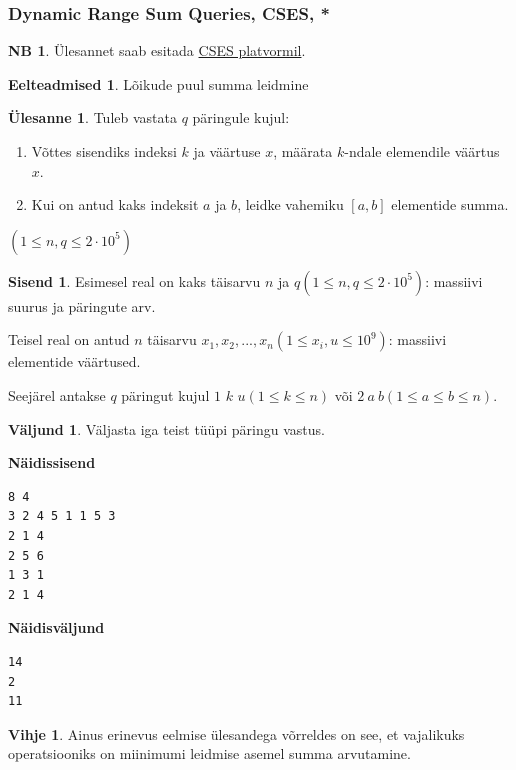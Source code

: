 \documentclass{trkut}
\theoremstyle{definition}
\newtheorem*{prereq}{Eelteadmised}
\newtheorem*{extra}{NB}
\newtheorem*{vihje}{Vihje}
\newtheorem*{Input}{Sisend}
\newtheorem*{Output}{Väljund}
\newtheorem*{Text}{Ülesanne}
\begin{document}
\subsubsection{Dynamic Range Sum Queries, CSES, *}
\begin{extra}
Ülesannet saab esitada \href{https://cses.fi/problemset/task/1648}{CSES platvormil}.
\end{extra}
\begin{prereq}
Lõikude puul summa leidmine
\end{prereq}
\begin{Text}
Tuleb vastata $q$ päringule kujul:
\begin{enumerate}
\item Võttes sisendiks indeksi $k$ ja väärtuse $x$, määrata $k$-ndale elemendile väärtus $x$.
\item Kui on antud kaks indeksit $a$ ja $b$, leidke vahemiku $[a,b]$ elementide summa.
\end{enumerate}

$(1\le n,q\le 2\cdot 10^5)$

\parencite{sum}
\end{Text}

\begin{Input}
Esimesel real on kaks täisarvu $n$ ja $q$$(1\le n,q\le 2\cdot 10^5)$: massiivi suurus ja päringute arv.

Teisel real on antud $n$ täisarvu $x_1,x_2,...,x_n$$(1\le x_i,u\le 10^9)$: massiivi elementide väärtused.

Seejärel antakse $q$ päringut kujul $1$ $k$ $u$$(1\le k\le n)$ või $2\ a\ b$$(1\le a\le b\le n)$.
\end{Input}
\begin{Output}
Väljasta iga teist tüüpi päringu vastus.
\end{Output}

\textbf{Näidissisend}

\begin{verbatim}
8 4
3 2 4 5 1 1 5 3
2 1 4
2 5 6
1 3 1
2 1 4
\end{verbatim}

\textbf{Näidisväljund}

\begin{verbatim}
14
2
11
\end{verbatim}


\begin{vihje}
Ainus erinevus eelmise ülesandega võrreldes on see, et vajalikuks operatsiooniks on miinimumi leidmise asemel summa arvutamine.
\end{vihje}
\end{document}
